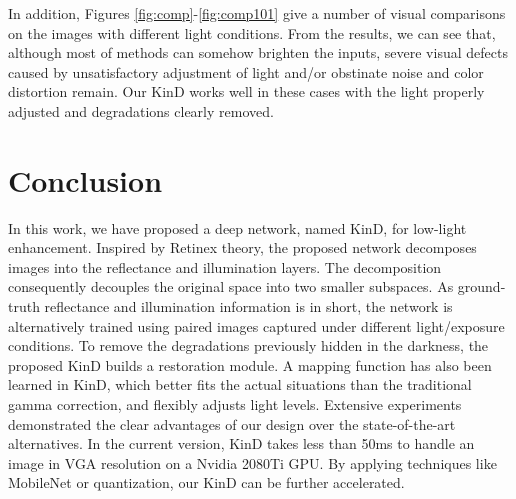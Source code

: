 \documentclass[journal,10pt,compsoc]{IEEEtran}
\begin{document}
In addition, Figures \ref{fig:comp}-\ref{fig:comp101} give a number of visual comparisons on the images with different light conditions. From the results, we can see that, although most of methods can somehow brighten the inputs, severe visual defects caused by unsatisfactory adjustment of light and/or obstinate noise and color distortion remain. Our KinD works well in these cases with the light properly adjusted and degradations clearly removed. 


\section{Conclusion}

In this work, we have proposed a deep network, named KinD, for low-light enhancement. Inspired by Retinex theory, the proposed network decomposes images into the reflectance and illumination layers. The decomposition consequently decouples the original space into two smaller subspaces. As ground-truth reflectance and illumination information is in short, the network is alternatively trained using paired images captured under different light/exposure conditions. To remove the degradations previously hidden in the darkness, the proposed KinD builds a restoration module.
A mapping function has also been learned in KinD, which better fits the actual situations than the traditional gamma correction, and flexibly adjusts light levels. Extensive experiments demonstrated the clear advantages of our design over the state-of-the-art alternatives. In the current version, KinD takes less than 50ms to handle an image in VGA resolution on a Nvidia 2080Ti GPU. By applying techniques like MobileNet or quantization, our KinD can be further accelerated. 

















\end{document}
